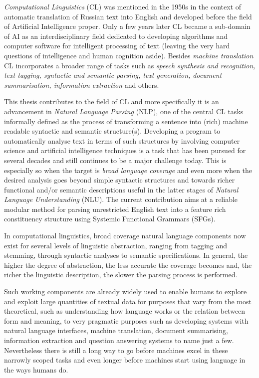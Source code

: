 \textit{Computational Linguistics} (CL) was mentioned in the 1950s in the context of automatic translation \citep{Hutchins1999} of Russian text into English and developed before the field of Artificial Intelligence proper. Only a few years later CL became a sub-domain of AI as an interdisciplinary field dedicated to developing algorithms and computer software for intelligent processing of text (leaving the very hard questions of intelligence and human cognition aside). Besides \textit{machine translation} CL incorporates a broader range of tasks such as \textit{speech synthesis and recognition, text tagging, syntactic and semantic parsing, text generation, document summarisation, information extraction} and others. 

This thesis contributes to the field of CL and more specifically it is an advancement in \textit{Natural Language Parsing} (NLP), one of the central CL tasks informally defined as the process of transforming a sentence into (rich) machine readable syntactic and semantic structure(s). Developing a program to automatically analyse text in terms of such structures by involving computer science and artificial intelligence techniques is a task that has been pursued for several decades and still continues to be a major challenge today. This is especially so when the target is \textit{broad language coverage} and even more when the desired analysis goes beyond simple syntactic structures and towards richer functional and/or semantic descriptions useful in the latter stages of \textit{Natural Language Understanding} (NLU). The current contribution aims at a reliable modular method for parsing unrestricted English text into a feature rich constituency structure using Systemic Functional Grammars (SFGs). 

In computational linguistics, broad coverage natural language components now exist for several levels of linguistic abstraction, ranging from tagging and stemming, through syntactic analyses to semantic specifications. In general, the higher the degree of abstraction, the less accurate the coverage becomes and, the richer the linguistic description, the slower the parsing process is performed. 

Such working components are already widely used to enable humans to explore and exploit large quantities of textual data for purposes that vary from the most theoretical, such as understanding how language works or the relation between form and meaning, to very pragmatic purposes such as developing systems with natural language interfaces, machine translation, document summarising, information extraction and question answering systems to name just a few. Nevertheless there is still a long way to go before machines excel in these narrowly scoped tasks and even longer before machines start using language in the ways humans do.

